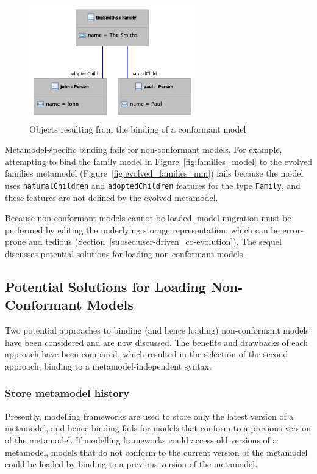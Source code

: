 \begin{figure}[htbp]
  \centering
  \includegraphics[height=5cm]{5.Implementation/images/successful_binding.pdf}
  \caption{Objects resulting from the binding of a conformant model}
  \label{fig:successful_binding}
\end{figure}

Metamodel-specific binding fails for non-conformant models. For example, attempting to bind the family model in Figure~\ref{fig:families_model} to the evolved families metamodel (Figure~\ref{fig:evolved_families_mm}) fails because the model uses \texttt{na\-tu\-r\-alCh\-il\-dr\-en} and \texttt{ad\-op\-t\-edCh\-il\-dr\-en} features for the type \texttt{Fa\-mi\-ly}, and these features are not defined by the evolved metamodel.

Because non-conformant models cannot be loaded, model migration must be performed by editing the underlying storage representation, which can be error-prone and tedious (Section~\ref{subsec:user-driven_co-evolution}). The sequel discusses potential solutions for loading non-conformant models.

\subsection{Potential Solutions for Loading Non-Conformant Models}
Two potential approaches to binding (and hence loading) non-conformant models have been considered and are now discussed. The benefits and drawbacks of each approach have been compared, which resulted in the selection of the second approach, binding to a metamodel-independent syntax.

\subsubsection{Store metamodel history}
Presently, modelling frameworks are used to store only the latest version of a metamodel, and hence binding fails for models that conform to a previous version of the metamodel. If modelling frameworks could access old versions of a metamodel, models that do not conform to the current version of the metamodel could be loaded by binding to a previous version of the metamodel.

